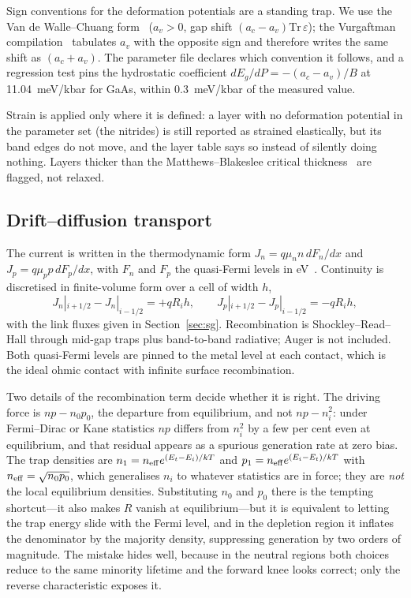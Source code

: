 \documentclass[preprint,12pt]{elsarticle}
\begin{document}
Sign conventions for the deformation potentials are a standing trap. We use
the Van de Walle--Chuang form~\cite{VandeWalle1989,Chuang1991} ($a_v>0$, gap
shift $(a_c-a_v)\mathrm{Tr}\,\varepsilon$); the Vurgaftman
compilation~\cite{Vurgaftman2001} tabulates $a_v$ with the opposite sign and
therefore writes the same shift as $(a_c+a_v)$. The parameter file declares
which convention it follows, and a regression test pins the hydrostatic
coefficient $dE_g/dP=-(a_c-a_v)/B$ at \SI{11.04}{meV/kbar} for GaAs, within
\SI{0.3}{meV/kbar} of the measured value.

Strain is applied only where it is defined: a layer with no deformation
potential in the parameter set (the nitrides) is still reported as strained
elastically, but its band edges do not move, and the layer table says so
instead of silently doing nothing. Layers thicker than the
Matthews--Blakeslee critical thickness~\cite{Matthews1974} are flagged, not
relaxed.

\subsection{Drift--diffusion transport}

The current is written in the thermodynamic form $J_n=q\mu_n n\,dF_n/dx$ and
$J_p=q\mu_p p\,dF_p/dx$, with $F_n$ and $F_p$ the quasi-Fermi levels in
eV~\cite{Selberherr1984,Lundstrom2000}.
Continuity is discretised in finite-volume form over a cell of width $h$,
\begin{equation}
  J_n|_{i+1/2}-J_n|_{i-1/2} = +qR_ih, \qquad
  J_p|_{i+1/2}-J_p|_{i-1/2} = -qR_ih,
  \label{eq:continuity}
\end{equation}
with the link fluxes given in Section~\ref{sec:sg}. Recombination is
Shockley--Read--Hall through mid-gap traps plus band-to-band radiative;
Auger is not included. Both quasi-Fermi levels are pinned to the metal level at
each contact, which is the ideal ohmic contact with infinite surface
recombination.

Two details of the recombination term decide whether it is right. The driving
force is $np-n_0p_0$, the departure from equilibrium, and not $np-n_i^2$:
under Fermi--Dirac or Kane statistics $np$ differs from $n_i^2$ by a few per
cent even at equilibrium, and that residual appears as a spurious generation
rate at zero bias. The trap densities are
$n_1=n_{\rm eff}e^{(E_t-E_i)/kT}$ and $p_1=n_{\rm eff}e^{(E_i-E_t)/kT}$ with
$n_{\rm eff}=\sqrt{n_0p_0}$, which generalises $n_i$ to whatever statistics are
in force; they are \emph{not} the local equilibrium densities. Substituting
$n_0$ and $p_0$ there is the tempting shortcut---it also makes $R$ vanish at
equilibrium---but it is equivalent to letting the trap energy slide with the
Fermi level, and in the depletion region it inflates the denominator by the
majority density, suppressing generation by two orders of magnitude. The
mistake hides well, because in the neutral regions both choices reduce to the
same minority lifetime and the forward knee looks correct; only the reverse
characteristic exposes it.
\end{document}
